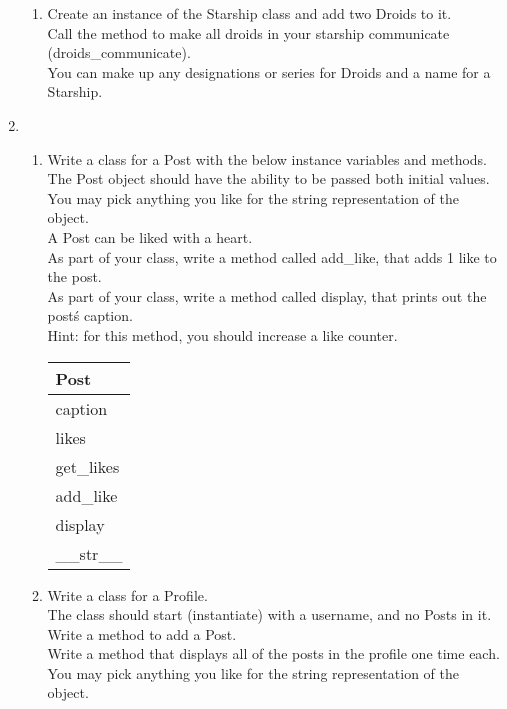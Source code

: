 \documentclass{article}
\begin{document}
\begin{enumerate}
\begin{enumerate}
		\item
			Create an instance of the Starship class and add two Droids to it.\\
			Call the method to make all droids in your starship communicate (droids\_communicate).\\
			You can make up any designations or series for Droids and a name for a Starship.\\
	\end{enumerate}
\pagebreak



	\item
	\begin{enumerate}
		\item
			Write a class for a Post with the below instance variables and methods.\\ 
			The Post object should have the ability to be passed both initial values.\\  
			You may pick anything you like for the string representation of the object.\\
			A Post can be liked with a heart.\\  
			As part of your class, write a method called add\_like, that adds 1 like to the post.\\
			As part of your class, write a method called display, that prints out the post\'s caption.\\
			Hint: for this method, you should increase a like counter.
			\begin{flushright}
			\begin{tabular}{|l|}
				\hline
				Post\\ \hline
				caption\\	likes\\	 \hline
				get\_likes \\ add\_like \\ display \\ \_\_str\_\_ \\ \hline
			\end{tabular}
			\end{flushright}

		\item
			Write a class for a Profile. \\
			The class should start (instantiate) with a username, and no Posts in it. \\ 
			Write a method to add a Post.\\
			Write a method that displays all of the posts in the profile one time each.\\
			You may pick anything you like for the string representation of the object.
	

\end{enumerate}
\end{enumerate}
\end{document}
